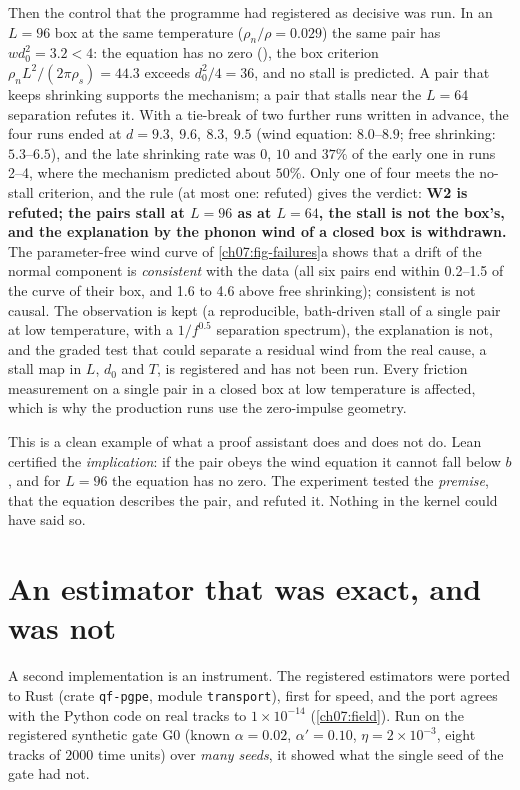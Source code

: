 Then the control that the programme had registered as decisive was run. In an $L=96$ box at the same temperature ($\rho_n/\rho=0.029$) the same pair has $wd_0^2=3.2<4$: the equation has no zero (), the box criterion $\rho_nL^2/(2\pi\rho_s)=44.3$ exceeds $d_0^2/4=36$, and no stall is predicted. A pair that keeps shrinking supports the mechanism; a pair that stalls near the $L=64$
separation refutes it. With a tie-break of two further runs written in advance, the four runs ended at $d=9.3,\ 9.6,\ 8.3,\ 9.5$ (wind equation: $8.0$--$8.9$; free shrinking: $5.3$--$6.5$), and the late shrinking rate was $0$, $10$ and $37\%$ of the early one in runs 2--4, where the mechanism predicted about $50\%$. Only one of four meets the no-stall criterion, and the rule (at most one: refuted) gives the verdict:
\textbf{W2 is refuted; the pairs stall at $L=96$ as at $L=64$, the stall is not the box's, and the explanation by the phonon wind of a closed box is withdrawn.} The parameter-free wind curve of \cref{ch07:fig-failures}a shows that a drift of the normal component is \emph{consistent} with the data (all six pairs end within 0.2--1.5 of the curve of their box, and 1.6 to 4.6 above free shrinking); consistent is not causal. The observation is kept (a reproducible, bath-driven stall
of a single pair at low temperature, with a $1/f^{0.5}$ separation spectrum), the explanation is not, and the graded test that could separate a residual wind from the real cause, a stall map in $L$, $d_0$ and $T$, is registered and has not been run. Every friction measurement on a single pair in a closed box at low temperature is affected, which is why the production runs use the zero-impulse geometry.

This is a clean example of what a proof assistant does and does not do. Lean certified the \emph{implication}: if the pair obeys the wind equation it cannot fall below $b$, and for $L=96$ the equation has no zero. The experiment tested the \emph{premise}, that the equation describes the pair, and refuted it. Nothing in the kernel could have said so.

\section{An estimator that was exact, and was not}\label{ch07:bias}

A second implementation is an instrument. The registered estimators were ported to Rust (crate \texttt{qf-pgpe}, module \texttt{transport}), first for speed, and the port agrees with the Python code on real tracks to $1\times10^{-14}$ (\cref{ch07:field}). Run on the registered synthetic gate G0 (known $\alpha=0.02$, $\alpha'=0.10$, $\eta=2\times10^{-3}$, eight tracks of $2000$ time units) over \emph{many seeds}, it showed what the single seed of
the gate had not.

